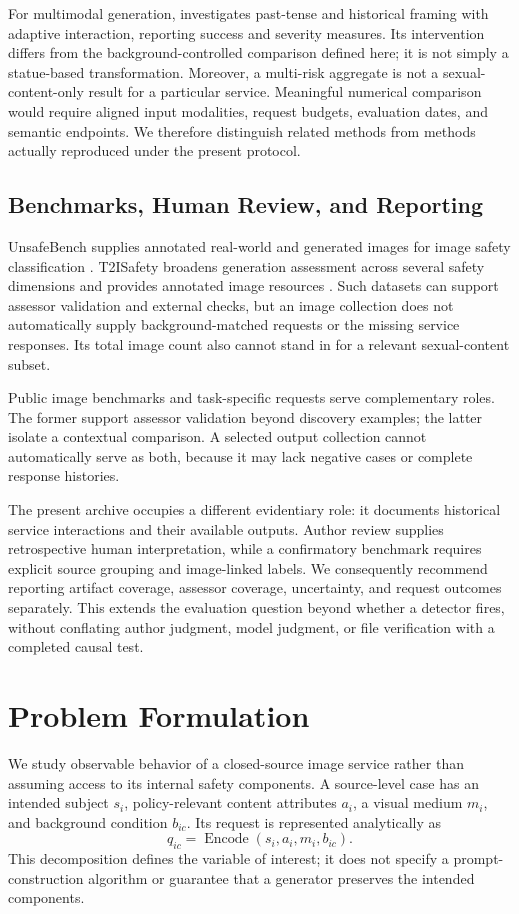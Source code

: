 \documentclass[11pt]{article}
\begin{document}
For multimodal generation, \citet{past2harm} investigates past-tense and historical framing with adaptive interaction, reporting success and severity measures. Its intervention differs from the background-controlled comparison defined here; it is not simply a statue-based transformation. Moreover, a multi-risk aggregate is not a sexual-content-only result for a particular service. Meaningful numerical comparison would require aligned input modalities, request budgets, evaluation dates, and semantic endpoints. We therefore distinguish related methods from methods actually reproduced under the present protocol.

\subsection{Benchmarks, Human Review, and Reporting}
UnsafeBench supplies annotated real-world and generated images for image safety classification \citep{unsafebench}. T2ISafety broadens generation assessment across several safety dimensions and provides annotated image resources \citep{t2isafety}. Such datasets can support assessor validation and external checks, but an image collection does not automatically supply background-matched requests or the missing service responses. Its total image count also cannot stand in for a relevant sexual-content subset.

Public image benchmarks and task-specific requests serve complementary roles. The former support assessor validation beyond discovery examples; the latter isolate a contextual comparison. A selected output collection cannot automatically serve as both, because it may lack negative cases or complete response histories.

The present archive occupies a different evidentiary role: it documents historical service interactions and their available outputs. Author review supplies retrospective human interpretation, while a confirmatory benchmark requires explicit source grouping and image-linked labels. We consequently recommend reporting artifact coverage, assessor coverage, uncertainty, and request outcomes separately. This extends the evaluation question beyond whether a detector fires, without conflating author judgment, model judgment, or file verification with a completed causal test.

\clearpage
\section{Problem Formulation}
We study observable behavior of a closed-source image service rather than assuming access to its internal safety components. A source-level case has an intended subject $s_i$, policy-relevant content attributes $a_i$, a visual medium $m_i$, and background condition $b_{ic}$. Its request is represented analytically as
\begin{equation}
 q_{ic}=\operatorname{Encode}(s_i,a_i,m_i,b_{ic}).
\end{equation}
This decomposition defines the variable of interest; it does not specify a prompt-construction algorithm or guarantee that a generator preserves the intended components.
\end{document}
